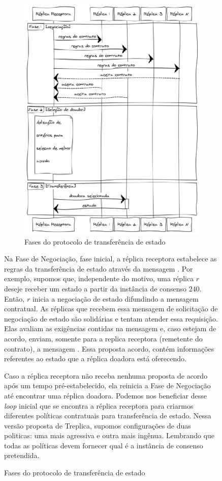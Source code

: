 \begin{figure}[ht]
\begin{figure}[ht]
  \centering
  \includegraphics[width=11cm]{conteudo/capitulos/figuras/fases_protocolo.eps}
  \caption{Fases do protocolo de transferência de estado}
  \label{fig:fases_protocolo}
\end{figure}

Na Fase de Negociação, fase inicial, a réplica receptora estabelece as regras da
transferência de estado através da mensagem . Por exemplo,
supomos que, independente do motivo, uma réplica $r$ deseje receber um estado a partir da
instância de consenso $240$. Então, $r$ inicia a negociação de estado difundindo a
mensagem contratual. As réplicas que recebem essa mensagem de solicitação de negociação de
estado são solidárias e tentam atender essa requisição. Elas avaliam as exigências
contidas na mensagem e, caso estejam de acordo, enviam, somente para a replica receptora
(remetente do contrato), a mensagem . Essa proposta acordo, contém
informações referentes ao estado que a réplica doadora está oferecendo.

Caso a réplica receptora não receba nenhuma proposta de acordo após um tempo
pré-estabelecido, ela reinicia a Fase de Negociação até encontrar uma réplica doadora.
Podemos nos beneficiar desse \emph{loop} inicial que se encontra a réplica receptora para
criarmos diferentes políticas contratuais para transferência de estado. Nessa versão
proposta de Treplica, supomos configurações de duas politicas: uma mais agressiva e outra
mais ingênua. Lembrando que todas as políticas devem fornecer qual é a instância de
consenso pretendida.


\end{figure}
